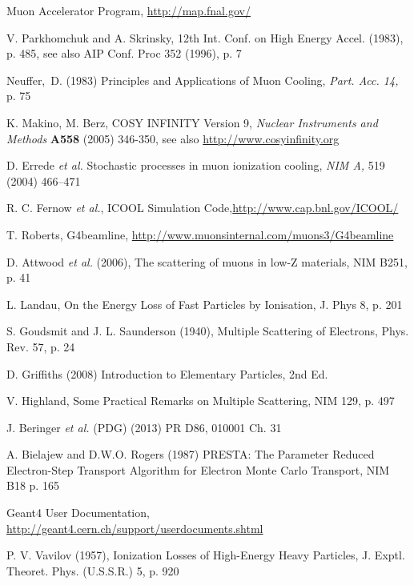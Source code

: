 \documentclass{jacow}
\begin{document}
\begin{thebibliography}{9}

Muon Accelerator Program, \url{http://map.fnal.gov/}

V. Parkhomchuk and A. Skrinsky, 12th Int. Conf. on High Energy Accel. (1983), p. 485, see also AIP Conf. Proc 352 (1996), p. 7 

Neuffer,~D. (1983) Principles and Applications of Muon Cooling, \emph{Part. Acc. 14,} p. 75

K. Makino, M. Berz, COSY INFINITY Version 9, \emph{Nuclear Instruments and Methods} \textbf{A558} (2005) 346-350, see also \url{http://www.cosyinfinity.org}


D. Errede \emph{et al.} Stochastic processes in muon ionization cooling, \emph {NIM A,} 519 (2004) 466--471

R. C. Fernow \emph{et al.}, ICOOL Simulation Code,\url{http://www.cap.bnl.gov/ICOOL/}

T. Roberts, G4beamline, \url{http://www.muonsinternal.com/muons3/G4beamline}

D. Attwood \emph{et al.} (2006), The scattering of muons in low-Z materials, NIM B251, p. 41

L. Landau, On the Energy Loss of Fast Particles by Ionisation, J. Phys 8, p. 201

S. Goudsmit and J. L. Saunderson (1940), Multiple Scattering of Electrons, Phys. Rev. 57, p. 24

D. Griffiths (2008) Introduction to Elementary Particles, 2nd Ed. 

V. Highland, Some Practical Remarks on Multiple Scattering, NIM 129, p. 497

J. Beringer \emph{et al.} (PDG) (2013) PR D86, 010001 Ch. 31

A. Bielajew and D.W.O. Rogers (1987) PRESTA: The Parameter Reduced Electron-Step Transport Algorithm for Electron Monte Carlo Transport, NIM B18 p. 165

Geant4 User Documentation, \url{http://geant4.cern.ch/support/userdocuments.shtml}

P. V. Vavilov (1957), Ionization Losses of High-Energy Heavy Particles, J. Exptl. Theoret. Phys. (U.S.S.R.) 5, p. 920

\end{thebibliography}
\ \\
\end{document}
